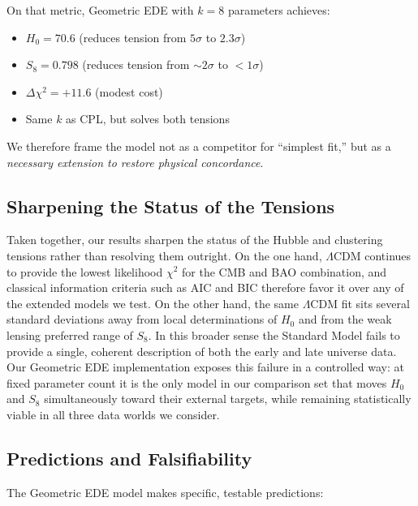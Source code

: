 On that metric, Geometric EDE with $k = 8$ parameters achieves:
\begin{itemize}
    \item $H_0 = 70.6$ (reduces tension from $5\sigma$ to $2.3\sigma$)
    \item $S_8 = 0.798$ (reduces tension from $\sim 2\sigma$ to $< 1\sigma$)
    \item $\Delta\chi^2 = +11.6$ (modest cost)
    \item Same $k$ as CPL, but solves both tensions
\end{itemize}

We therefore frame the model not as a competitor for ``simplest fit,'' but as a \emph{necessary extension to restore physical concordance}.

\subsection{Sharpening the Status of the Tensions}

Taken together, our results sharpen the status of the Hubble and clustering tensions rather than resolving them outright. On the one hand, $\Lambda$CDM continues to provide the lowest likelihood $\chi^2$ for the CMB and BAO combination, and classical information criteria such as AIC and BIC therefore favor it over any of the extended models we test. On the other hand, the same $\Lambda$CDM fit sits several standard deviations away from local determinations of $H_0$ and from the weak lensing preferred range of $S_8$. In this broader sense the Standard Model fails to provide a single, coherent description of both the early and late universe data. Our Geometric EDE implementation exposes this failure in a controlled way: at fixed parameter count it is the only model in our comparison set that moves $H_0$ and $S_8$ simultaneously toward their external targets, while remaining statistically viable in all three data worlds we consider.

\subsection{Predictions and Falsifiability}

The Geometric EDE model makes specific, testable predictions:

